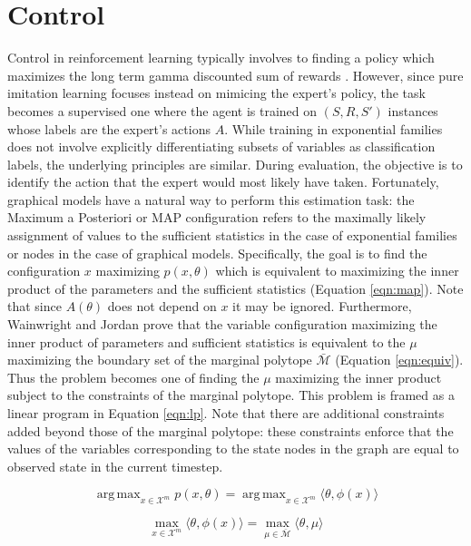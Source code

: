 \documentclass{article} %
\DeclareMathOperator*{\argmax}{arg\,max}
\begin{document}
\section{Control}

Control in reinforcement learning typically involves to finding a policy which
maximizes the long term gamma discounted sum of rewards \cite{sutton98}.
However, since pure imitation learning focuses instead on mimicing the expert's
policy, the task becomes a supervised one where the agent is trained on
$(S,R,S')$ instances whose labels are the expert's actions $A$. While training
in exponential families does not involve explicitly differentiating subsets of
variables as classification labels, the underlying principles are similar.
During evaluation, the objective is to identify the action that the expert
would most likely have taken. Fortunately, graphical models have a natural way
to perform this estimation task: the Maximum a Posteriori or MAP configuration
refers to the maximally likely assignment of values to the sufficient
statistics in the case of exponential families or nodes in the case of
graphical models. Specifically, the goal is to find the configuration $x$
maximizing $p(x,\theta)$ which is equivalent to maximizing the inner product of
the parameters and the sufficient statistics (Equation \ref{eqn:map}). Note
that since $A(\theta)$ does not depend on $x$ it may be ignored. Furthermore,
Wainwright and Jordan \cite{wainwright08} prove that the variable configuration
maximizing the inner product of parameters and sufficient statistics is
equivalent to the $\mu$ maximizing the boundary set of the marginal polytope
$\bar{\mathcal{M}}$ (Equation \ref{eqn:equiv}). Thus the problem becomes one of
finding the $\mu$ maximizing the inner product subject to the constraints of
the marginal polytope. This problem is framed as a linear program in Equation
\ref{eqn:lp}. Note that there are additional constraints added beyond those of
the marginal polytope: these constraints enforce that the values of the
variables corresponding to the state nodes in the graph are equal to observed
state in the current timestep.

\begin{equation}
\argmax_{x \in \mathcal{X}^m} p(x,\theta) = \argmax_{x \in \mathcal{X}^m} \langle \theta, \phi(x) \rangle
\label{eqn:map}
\end{equation}

\begin{equation}
\max_{x \in \mathcal{X}^m} \langle \theta,\phi(x) \rangle = \max_{\mu \in \bar{\mathcal{M}}} \langle \theta, \mu \rangle
\label{eqn:equiv}
\end{equation}
\end{document}
